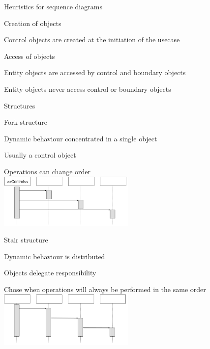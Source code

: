 \documentclass[10pt]{article}
\begin{document}
	\item Heuristics for sequence diagrams
	\enumstart
		\item Creation of objects
		\enumstart
			\item Control objects are created at the initiation of the usecase
		\enumend
		\item Access of objects
		\enumstart
			\item Entity objects are accessed by control and boundary objects
			\item Entity objects never access control or boundary objects
		\enumend
	\enumend

	\item Structures
	\enumstart
		\item Fork structure
		\enumstart
			\item Dynamic behaviour concentrated in a single object
			\item Usually a control object
			\item Operations can change order
			\\ \includegraphics[width=0.5\textwidth]{fork_structure.png}
		\enumend
		\item Stair structure
		\enumstart
			\item Dynamic behaviour is distributed
			\item Objects delegate responsibility
			\item Chose when operations will always be performed in the same order
			\\ \includegraphics[width=0.5\textwidth]{stair_structure.png}
		\enumend
	\enumend
\enumend
\end{document}
